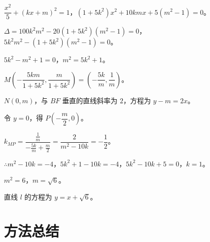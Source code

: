 \documentclass[11pt]{ctexrep}
\begin{document}
$\dfrac{x^2}{5} + (kx + m)^2 = 1$，$(1 + 5k^2)x^2 + 10kmx + 5(m^2 - 1) = 0$。

$\Delta = 100k^2m^2 - 20(1 + 5k^2)(m^2 - 1) = 0$，$5k^2m^2 - (1 + 5k^2)(m^2 - 1) = 0$。

$5k^2 - m^2 + 1 = 0$，$m^2 = 5k^2 + 1$。

$M\left(-\dfrac{5km}{1 + 5k^2}, \dfrac{m}{1 + 5k^2}\right) = \left(-\dfrac{5k}{m}, \dfrac{1}{m}\right)$。

$N(0, m)$，与 $BF$ 垂直的直线斜率为 $2$，方程为 $y - m = 2x$。

令 $y = 0$，得 $P\left(-\dfrac{m}{2}, 0\right)$。

$k_{MP} = \dfrac{\frac{1}{m}}{-\frac{5k}{m} + \frac{m}{2}} = \dfrac{2}{m^2 - 10k} = -\dfrac{1}{2}$。

$\therefore m^2 - 10k = -4$，$5k^2 + 1 - 10k = -4$，$5k^2 - 10k + 5 = 0$，$k = 1$。

$m^2 = 6$，$m = \sqrt{6}$。

直线 $l$ 的方程为 $\boxed{y = x + \sqrt{6}}$。

\section*{方法总结}
\end{document}
